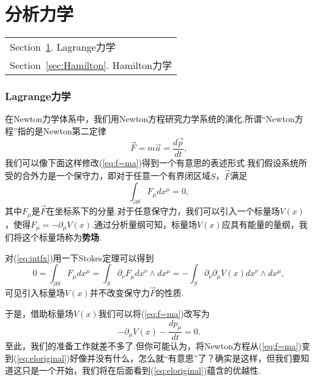 \part{分析力学}\label{Part:Analytical}
	\begin{margintable}\vspace{1.4in}\footnotesize
		\begin{tabularx}{\marginparwidth}{|X}
			Section~\ref{sec:Lagrange}. Lagrange力学\\
			Section~\ref{sec:Hamilton}. Hamilton力学\\
		\end{tabularx}
	\end{margintable}

	
	\section{Lagrange力学}\label{sec:Lagrange}
	在Newton力学体系中，我们用Newton方程研究力学系统的演化.所谓“Newton方程”指的是Newton第二定律
	\begin{equation}\label{eq:f=ma}
		\overrightarrow{F} =m\overrightarrow{a}=\frac{d\overrightarrow{p}}{dt},
	\end{equation}
	我们可以像下面这样修改(\ref{eq:f=ma})得到一个有意思的表述形式.我们假设系统所受的合外力是一个保守力，即对于任意一个有界闭区域$S$，$\overrightarrow{F}$满足
	\begin{equation}\label{eq:intfx}
		\int _{\partial S}F_\mu dx^\mu=0,
	\end{equation}
	其中$F_\mu$是$\overrightarrow{F}$在坐标系下的分量.对于任意保守力，我们可以引入一个标量场$V(x)$，使得$F_\mu=-\partial_\mu V(x)$.通过分析量纲可知，标量场$V(x)$应具有能量的量纲，我们将这个标量场称为\textbf{势场}.
	\begin{remark}
		对(\ref{eq:intfx})用一下Stokes定理可以得到
		$$0=\int_{\partial S}F_\mu dx^\mu=\int_S \partial_\nu F_\mu dx^\nu\wedge dx^\mu=-\int_S\partial_\nu \partial_\mu V(x) dx^\nu\wedge dx^\mu,$$
		可见引入标量场$V(x)$并不改变保守力$\overrightarrow{F}$的性质.
	\end{remark}
	于是，借助标量场$V(x)$我们可以将(\ref{eq:f=ma})改写为
	\begin{equation}\label{eq:eloriginal}
		-\partial_\mu V(x)-\frac{dp_\mu}{dt}=0.
	\end{equation}
	至此，我们的准备工作就差不多了.但你可能认为，将Newton方程从(\ref{eq:f=ma})变到(\ref{eq:eloriginal})好像并没有什么，怎么就“有意思”了？确实是这样，但我们要知道这只是一个开始，我们将在后面看到(\ref{eq:eloriginal})蕴含的优越性.
